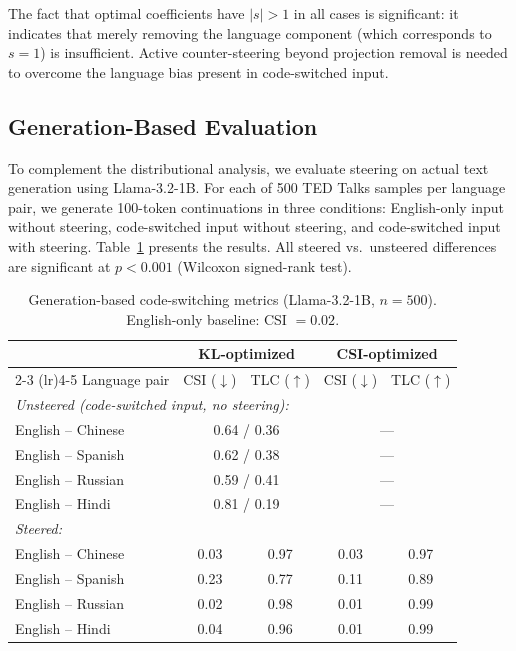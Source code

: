 The fact that optimal coefficients have $|s| > 1$ in all cases is significant: it indicates that merely removing the language component (which corresponds to $s = 1$) is insufficient. Active counter-steering beyond projection removal is needed to overcome the language bias present in code-switched input.

\subsection{Generation-Based Evaluation}

To complement the distributional analysis, we evaluate steering on actual text generation using Llama-3.2-1B. For each of 500 TED Talks samples per language pair, we generate 100-token continuations in three conditions: English-only input without steering, code-switched input without steering, and code-switched input with steering. Table~\ref{tab:gen_results} presents the results. All steered vs.\ unsteered differences are significant at $p < 0.001$ (Wilcoxon signed-rank test).

\begin{table}[!htb]
    \centering
    \small
    \caption{Generation-based code-switching metrics (Llama-3.2-1B, $n=500$). English-only baseline: CSI $= 0.02$.}
    \begin{tabular}{lcccc}
    \toprule
    & \multicolumn{2}{c}{KL-optimized} & \multicolumn{2}{c}{CSI-optimized} \\
    \cmidrule(lr){2-3} \cmidrule(lr){4-5}
    Language pair & CSI ($\downarrow$) & TLC ($\uparrow$) & CSI ($\downarrow$) & TLC ($\uparrow$) \\
    \midrule
    \multicolumn{5}{l}{\textit{Unsteered (code-switched input, no steering):}} \\
    English -- Chinese  & \multicolumn{2}{c}{0.64 / 0.36} & \multicolumn{2}{c}{---} \\
    English -- Spanish  & \multicolumn{2}{c}{0.62 / 0.38} & \multicolumn{2}{c}{---} \\
    English -- Russian  & \multicolumn{2}{c}{0.59 / 0.41} & \multicolumn{2}{c}{---} \\
    English -- Hindi    & \multicolumn{2}{c}{0.81 / 0.19} & \multicolumn{2}{c}{---} \\
    \midrule
    \multicolumn{5}{l}{\textit{Steered:}} \\
    English -- Chinese  & 0.03 & 0.97 & 0.03 & 0.97 \\
    English -- Spanish  & 0.23 & 0.77 & 0.11 & 0.89 \\
    English -- Russian  & 0.02 & 0.98 & 0.01 & 0.99 \\
    English -- Hindi    & 0.04 & 0.96 & 0.01 & 0.99 \\
    \bottomrule
    \end{tabular}
    \label{tab:gen_results}
\end{table}

